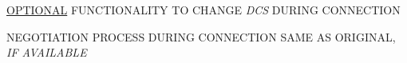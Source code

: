 

\begin{bwslide}

\begin{nrtc}
\item \underline{OPTIONAL} FUNCTIONALITY TO CHANGE {\em DCS} DURING CONNECTION
\item NEGOTIATION PROCESS DURING CONNECTION SAME AS ORIGINAL, {\em IF AVAILABLE}
\end{nrtc}
\end{bwslide}


%


%


%


